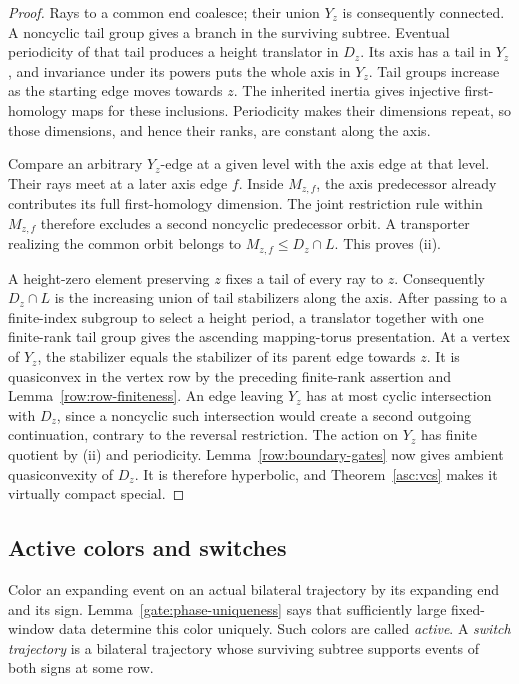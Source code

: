 \begin{proof}
Rays to a common end coalesce; their union $Y_z$ is consequently connected.
A noncyclic tail group gives a branch in the surviving subtree.  Eventual
periodicity of that tail produces a height translator in $D_z$.  Its axis
has a tail in $Y_z$, and invariance under its powers puts the whole axis
in $Y_z$.  Tail groups increase as the starting edge moves towards $z$.
The inherited inertia gives injective first-homology maps for these
inclusions.  Periodicity makes their dimensions repeat, so those
dimensions, and hence their ranks, are constant along the axis.

Compare an arbitrary $Y_z$-edge at a given level with the axis edge at
that level.  Their rays meet at a later axis edge $f$.  Inside $M_{z,f}$,
the axis predecessor already contributes its full first-homology dimension.
The joint restriction rule within $M_{z,f}$ therefore excludes a second
noncyclic predecessor orbit.  A transporter realizing the common orbit
belongs to $M_{z,f}\le D_z\cap L$.  This proves (ii).

A height-zero element preserving $z$ fixes a tail of every ray to $z$.
Consequently $D_z\cap L$ is the increasing union of tail stabilizers along
the axis.  After passing to a finite-index subgroup to select a height
period, a translator together with one finite-rank tail group gives the
ascending mapping-torus presentation.  At a vertex of $Y_z$, the
stabilizer equals the stabilizer of its parent edge towards $z$.  It is
quasiconvex in the vertex row by the preceding finite-rank assertion and
Lemma~\ref{row:row-finiteness}.  An edge leaving $Y_z$ has at most cyclic
intersection with $D_z$, since a noncyclic such intersection would create
a second outgoing continuation, contrary to the reversal restriction.
The action on $Y_z$ has finite quotient by (ii) and periodicity.
Lemma~\ref{row:boundary-gates} now gives ambient quasiconvexity of $D_z$.
It is therefore hyperbolic, and Theorem~\ref{asc:vcs} makes it virtually
compact special.
\end{proof}

\subsection{Active colors and switches}

Color an expanding event on an actual bilateral trajectory by its expanding
end and its sign.  Lemma~\ref{gate:phase-uniqueness} says that sufficiently
large fixed-window data determine this color uniquely.  Such colors are
called \emph{active}.  A \emph{switch trajectory} is a bilateral trajectory
whose surviving subtree supports events of both signs at some row.

